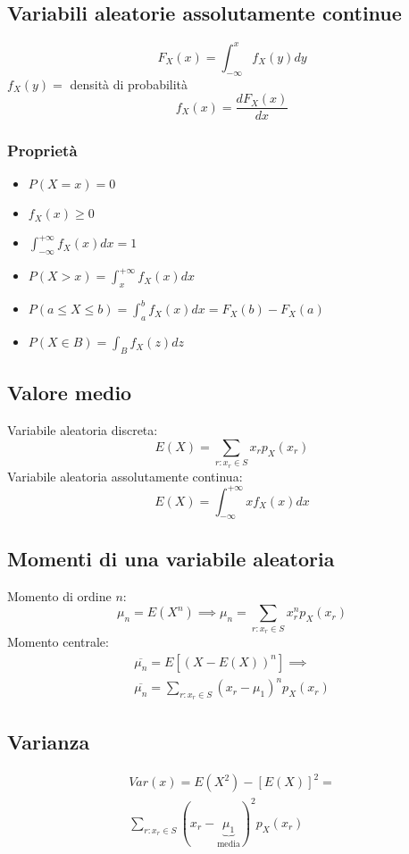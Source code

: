 \begin{multicols*}{2}
\subsection*{Variabili aleatorie assolutamente continue}
$$F_X(x) = \int_{-\infty}^{x} f_X(y)dy$$
$f_X(y) = $ densità di probabilità
$$f_X(x) = \frac{dF_X(x)}{dx}$$

\subsubsection*{Proprietà}
\begin{itemize}
    \item $P(X = x) = 0$
    \item $f_X(x) \ge 0$
    \item $\displaystyle \int_{-\infty}^{+\infty}f_X(x)dx=1$
    \item $P(X > x) = \displaystyle \int_{x}^{+\infty}f_X(x)dx$
    \item $P(a \le X \le b) = \displaystyle \int_{a}^{b}f_X(x)dx=F_X(b)-F_X(a)$
    \item $P(X \in B) = \displaystyle \int_{B}f_X(z)dz$
\end{itemize}

\subsection*{Valore medio}
Variabile aleatoria discreta:
$$
E(X) = \sum_{r: x_r \in S}x_r p_X(x_r)
$$
Variabile aleatoria assolutamente continua:
$$
E(X) = \int_{-\infty}^{+\infty}x f_X(x)dx
$$

\subsection*{Momenti di una variabile aleatoria}
Momento di ordine $n$:
$$
\mu_n = E(X^n) \implies \mu_n=\sum_{r: x_r \in S}x_r^n p_X(x_r)
$$
Momento centrale:
\begin{align*}
\overline{\mu_n} = E[(X-E(X))^n] \implies
\\\overline{\mu_n}=\sum_{r: x_r \in S}(x_r-\mu_1)^n p_X(x_r)
\end{align*}

\subsection*{Varianza}
\begin{align*}
\mathit{Var}(x) = E(X^2) - [E(X)]^2 =
\\\sum_{r: x_r \in S}(x_r - \underbrace{\mu_1}_{\text{media}})^2 p_X(x_r)
\end{align*}

\end{multicols*}

